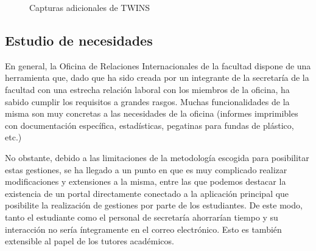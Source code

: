 \begin{figure}
	\ContinuedFloat

\label{fig:adicionales}
\caption{Capturas adicionales de TWINS}

\end{figure}

\subsection{Estudio de necesidades}

En general, la Oficina de Relaciones Internacionales de la facultad dispone de una herramienta que, dado que ha sido creada por un integrante de la secretaría de la facultad con una estrecha relación laboral con los miembros de la oficina, ha sabido cumplir los requisitos a grandes rasgos. Muchas funcionalidades de la misma son muy concretas a las necesidades de la oficina (informes imprimibles con documentación específica, estadísticas, pegatinas para fundas de plástico, etc.)

No obstante, debido a las limitaciones de la metodología escogida para posibilitar estas gestiones, se ha llegado a un punto en que es muy complicado realizar modificaciones y extensiones a la misma, entre las que podemos destacar la existencia de un portal directamente conectado a la aplicación principal que posibilite la realización de gestiones por parte de los estudiantes. De este modo, tanto el estudiante como el personal de secretaría ahorrarían tiempo y su interacción no sería íntegramente en el correo electrónico. Esto es también extensible al papel de los tutores académicos.

